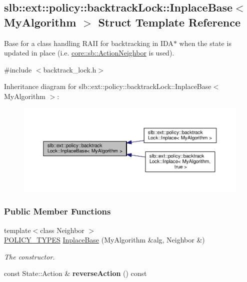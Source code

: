 \hypertarget{structslb_1_1ext_1_1policy_1_1backtrackLock_1_1InplaceBase}{}\subsection{slb\+:\+:ext\+:\+:policy\+:\+:backtrack\+Lock\+:\+:Inplace\+Base$<$ My\+Algorithm $>$ Struct Template Reference}
\label{structslb_1_1ext_1_1policy_1_1backtrackLock_1_1InplaceBase}


Base for a class handling R\+A\+II for backtracking in I\+D\+A$\ast$ when the state is updated in place (i.\+e. \hyperlink{structslb_1_1core_1_1sb_1_1ActionNeighbor}{core\+::sb\+::\+Action\+Neighbor} is used).  




{\ttfamily \#include $<$backtrack\+\_\+lock.\+h$>$}



Inheritance diagram for slb\+:\+:ext\+:\+:policy\+:\+:backtrack\+Lock\+:\+:Inplace\+Base$<$ My\+Algorithm $>$\+:\nopagebreak
\begin{figure}[H]
\begin{center}
\leavevmode
\includegraphics[width=350pt]{structslb_1_1ext_1_1policy_1_1backtrackLock_1_1InplaceBase__inherit__graph}
\end{center}
\end{figure}
\subsubsection*{Public Member Functions}
\begin{DoxyCompactItemize}
\item 
{\footnotesize template$<$class Neighbor $>$ }\\\hyperlink{extensions_2shared__policies_2headers_8h_ae70a06fa4631780beea14971eb36a562}{P\+O\+L\+I\+C\+Y\+\_\+\+T\+Y\+P\+ES} \hyperlink{structslb_1_1ext_1_1policy_1_1backtrackLock_1_1InplaceBase_a7094400b487ebbfbb4f1fe7c1f3df142}{Inplace\+Base} (My\+Algorithm \&alg, Neighbor \&)
\begin{DoxyCompactList}\small\item\em The constructor. \end{DoxyCompactList}\item 
const State\+::\+Action \& {\bfseries reverse\+Action} () const \hypertarget{structslb_1_1ext_1_1policy_1_1backtrackLock_1_1InplaceBase_a3303fe718a64b292c2a9f5e3be312ddc}{}\label{structslb_1_1ext_1_1policy_1_1backtrackLock_1_1InplaceBase_a3303fe718a64b292c2a9f5e3be312ddc}

\end{DoxyCompactItemize}
